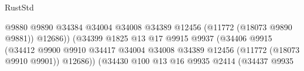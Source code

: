 \begin{lexlean}{RustStd}
\begin{coremodule}
                                                                    @9880
                                                                    @9890
                                                                    @34384
                                                                    @34004
                                                                    @34008
                                                                    @34389
                                                                    @12456
                                                                    (@11772 (@18073 @9890 @9881))
                                                                    @12686))
                                                                (@34399
                                                                  @1825
                                                                  @13
                                                                  @17
                                                                  @9915
                                                                  @9937
                                                                  (@34406
                                                                    @9915
                                                                    (@34412
                                                                      @9900
                                                                      @9910
                                                                      @34417
                                                                      @34004
                                                                      @34008
                                                                      @34389
                                                                      @12456
                                                                      (@11772 (@18073 @9910 @9901))
                                                                      @12686))
                                                                  (@34430
                                                                    @100
                                                                    @13
                                                                    @16
                                                                    @9935
                                                                    @2414
                                                                    (@34437
                                                                      @9935

\end{coremodule}
\end{lexlean}
